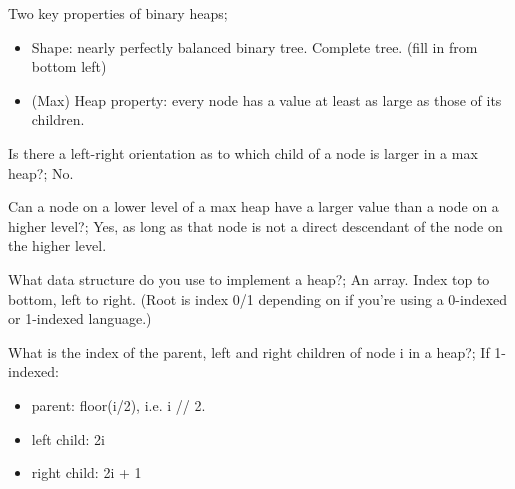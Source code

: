 \documentclass{article}
\begin{document}
	
Two key properties of binary heaps; \begin{itemize}
	\item Shape: nearly perfectly balanced binary tree. Complete tree. (fill in from bottom left)
	\item (Max) Heap property: every node has a value at least as large as those of its children.
\end{itemize}

Is there a left-right orientation as to which child of a node is larger in a max heap?; No.

Can a node on a lower level of a max heap have a larger value than a node on a higher level?; Yes, as long as that node is not a direct descendant of the node on the higher level.

What data structure do you use to implement a heap?; An array. Index top to bottom, left to right. (Root is index 0/1 depending on if you're using a 0-indexed or 1-indexed language.)

What is the index of the parent, left and right children of node i in a heap?; If 1-indexed: \begin{itemize}
	\item parent: floor(i/2), i.e. i // 2.
	\item left child: 2i
	\item right child: 2i + 1
\end{itemize}
\end{document}
